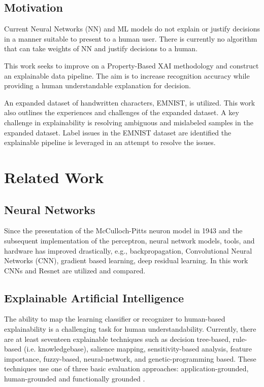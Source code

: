 \documentclass[conference]{IEEEtran}
\begin{document}
\subsection{Motivation}

Current Neural Networks (NN) and ML models do not explain or justify decisions
in a manner suitable to present to a human user.  There is currently no
algorithm that can take weights of NN and justify decisions to a human.

This work seeks to improve on a Property-Based XAI methodology and construct an
explainable data pipeline. The aim is to increase recognition accuracy while
providing a human understandable explanation for decision.

An expanded dataset of handwritten characters, EMNIST, is utilized. This work
also outlines the experiences and challenges of the expanded dataset. A key
challenge in explainability is resolving ambiguous and mislabeled samples in the
expanded dataset.  Label issues in the EMNIST dataset are identified the
explainable pipeline is leveraged in an attempt to resolve the issues.

\section{Related Work}

\subsection{Neural Networks}

Since the presentation of the McCulloch-Pitts neuron
model\cite{McCulloch1943-MCCALC-5} in 1943 and the subsequent implementation of
the perceptron\cite{rosenblatt1957perceptron}, neural network models, tools, and
hardware has improved drastically, e.g., backpropagation\cite{6795724},
Convolutional Neural Networks (CNN)\cite{fukushima1982neocognitron}, gradient
based learning\cite{726791}, deep residual learning\cite{7780459}.  In this work
CNNs and Resnet are utilized and compared.

\subsection{Explainable Artificial Intelligence}

The ability to map the learning classifier or recognizer to human-based
explainability is a challenging task for human understandability.  Currently,
there are at least seventeen explainable techniques such as decision tree-based,
rule-based (i.e. knowledgebase), salience mapping, sensitivity-based analysis,
feature importance, fuzzy-based, neural-network, and genetic-programming based.
These techniques use one of three basic evaluation approaches:
application-grounded, human-grounded and functionally grounded
\cite{Arrieta2020ExplainableAI,Survey18,Fuzzy19,Hagras18,GP18}.
\end{document}
